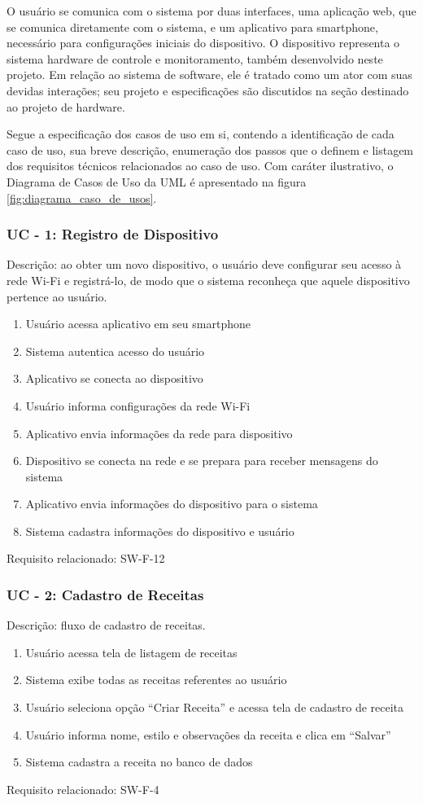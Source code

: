 O usuário se comunica com o sistema por duas interfaces, uma aplicação web, que se comunica diretamente com o sistema, e um aplicativo para smartphone, necessário para configurações iniciais do dispositivo. O dispositivo representa o sistema hardware de controle e monitoramento, também desenvolvido neste projeto. Em relação ao sistema de software, ele é tratado como um ator com suas devidas interações; seu projeto e especificações são discutidos na seção destinado ao projeto de hardware.

Segue a especificação dos casos de uso em si, contendo a identificação de cada caso de uso, sua breve descrição, enumeração dos passos que o definem e 
listagem dos requisitos técnicos relacionados ao caso de uso. Com caráter ilustrativo, o Diagrama de Casos de Uso da UML é apresentado na figura \ref{fig:diagrama_caso_de_usos}.

\subsubsection*{UC - 1: Registro de Dispositivo} 

Descrição: ao obter um novo dispositivo, o usuário deve configurar seu acesso à rede Wi-Fi e registrá-lo, de modo que o sistema reconheça que aquele 
dispositivo pertence ao usuário.
\begin{enumerate}
    \item Usuário acessa aplicativo em seu smartphone
    \item Sistema autentica acesso do usuário
    \item Aplicativo se conecta ao dispositivo 
    \item Usuário informa configurações da rede Wi-Fi
    \item Aplicativo envia informações da rede para dispositivo
    \item Dispositivo se conecta na rede e se prepara para receber mensagens do sistema
    \item Aplicativo envia informações do dispositivo para o sistema
    \item Sistema cadastra informações do dispositivo e usuário
\end{enumerate}
Requisito relacionado: SW-F-12

\subsubsection*{UC - 2: Cadastro de Receitas}
Descrição: fluxo de cadastro de receitas.
\begin{enumerate}
    \item Usuário acessa tela de listagem de receitas
    \item Sistema exibe todas as receitas referentes ao usuário
    \item Usuário seleciona opção “Criar Receita” e acessa tela de cadastro de receita
    \item Usuário informa nome, estilo e observações da receita e clica em “Salvar”
    \item Sistema cadastra a receita no banco de dados
\end{enumerate}
Requisito relacionado: SW-F-4

